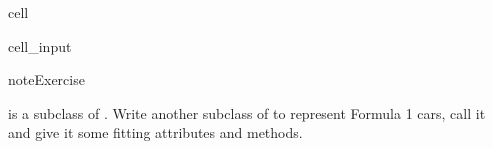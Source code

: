 \documentclass[letterpaper,10pt,english]{jupyterBook}
\begin{document}
\begin{sphinxuseclass}{cell}\begin{sphinxVerbatimInput}

\begin{sphinxuseclass}{cell_input}
\begin{sphinxVerbatim}[commandchars=\\\{\}]
  
\end{sphinxVerbatim}

\end{sphinxuseclass}\end{sphinxVerbatimInput}

\end{sphinxuseclass}
\begin{sphinxadmonition}{note}{Exercise}

\sphinxAtStartPar
{} is a subclass of . Write another subclass of  to represent Formula 1 cars, call it  and give it some fitting attributes and methods.
\end{sphinxadmonition}
\end{document}
